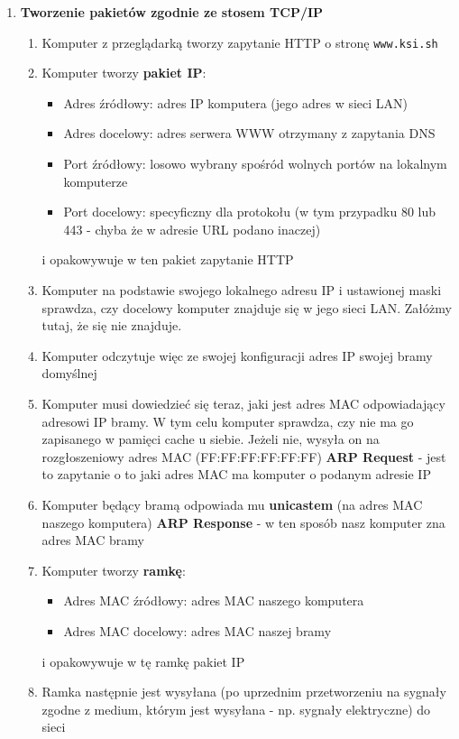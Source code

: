 \documentclass[main.tex]{subfiles}
\begin{document}
\begin{enumerate}
        \item \textbf{Tworzenie pakietów zgodnie ze stosem TCP/IP}
        \begin{enumerate}
            \item Komputer z przeglądarką tworzy zapytanie HTTP o stronę \texttt{www.ksi.sh}
            \item Komputer tworzy \textbf{pakiet IP}:
            \begin{itemize}
                \item Adres źródłowy: adres IP komputera (jego adres w sieci LAN)
                \item Adres docelowy: adres serwera WWW otrzymany z zapytania DNS
                \item Port źródłowy: losowo wybrany spośród wolnych portów na lokalnym komputerze
                \item Port docelowy: specyficzny dla protokołu (w tym przypadku 80 lub 443 - chyba że w adresie URL podano inaczej)
            \end{itemize}
            i opakowywuje w ten pakiet zapytanie HTTP
            \item Komputer na podstawie swojego lokalnego adresu IP i ustawionej maski sprawdza, czy docelowy komputer znajduje się w jego sieci LAN.
            Załóżmy tutaj, że się nie znajduje.
            \item Komputer odczytuje więc ze swojej konfiguracji adres IP swojej bramy domyślnej
            \item Komputer musi dowiedzieć się teraz, jaki jest adres MAC odpowiadający adresowi IP bramy.
            W tym celu komputer sprawdza, czy nie ma go zapisanego w pamięci cache u siebie.
            Jeżeli nie, wysyła on na rozgłoszeniowy adres MAC (FF:FF:FF:FF:FF:FF) \textbf{ARP Request} - jest to zapytanie o to jaki adres MAC ma komputer o podanym adresie IP
            \item Komputer będący bramą odpowiada mu \textbf{unicastem} (na adres MAC naszego komputera) \textbf{ARP Response} - w ten sposób nasz komputer zna adres MAC bramy
            \item Komputer tworzy \textbf{ramkę}:
            \begin{itemize}
                \item Adres MAC źródłowy: adres MAC naszego komputera
                \item Adres MAC docelowy: adres MAC naszej bramy
            \end{itemize}
            i opakowywuje w tę ramkę pakiet IP
            \item Ramka następnie jest wysyłana (po uprzednim przetworzeniu na sygnały zgodne z medium, którym jest wysyłana - np. sygnały elektryczne) do sieci
        \end{enumerate}


\end{enumerate}
\end{document}
